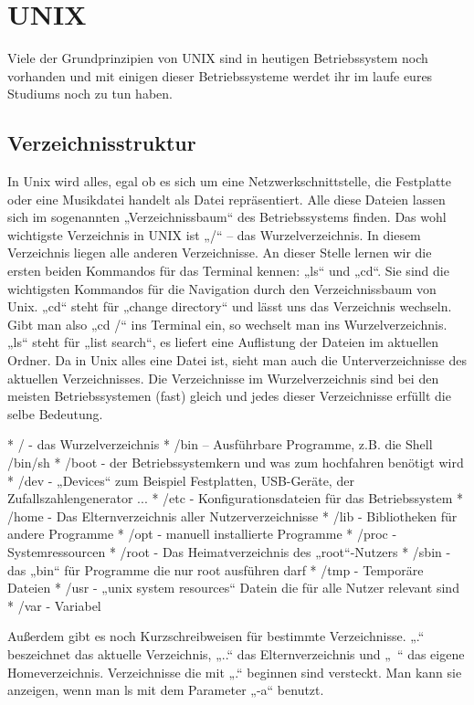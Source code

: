 \chapter{UNIX}

Viele der Grundprinzipien von UNIX sind in heutigen Betriebssystem noch vorhanden und mit einigen dieser Betriebssysteme werdet ihr im laufe eures Studiums noch zu tun haben.

\section{Verzeichnisstruktur}
In Unix wird alles, egal ob es sich um eine Netzwerkschnittstelle, die Festplatte oder eine Musikdatei handelt als Datei repräsentiert. Alle diese Dateien lassen sich im sogenannten „Verzeichnissbaum“ des Betriebssystems finden. Das wohl wichtigste Verzeichnis in UNIX ist „/“ – das Wurzelverzeichnis. In diesem Verzeichnis liegen alle anderen Verzeichnisse.
An dieser Stelle lernen wir die ersten beiden Kommandos für das Terminal kennen: „ls“ und „cd“. Sie sind die wichtigsten Kommandos für die Navigation durch den Verzeichnissbaum von Unix. „cd“ steht für „change directory“ und lässt uns das Verzeichnis wechseln. Gibt man also „cd /“ ins Terminal ein, so wechselt man ins Wurzelverzeichnis. „ls“ steht für „list search“, es liefert eine Auflistung der Dateien im aktuellen Ordner.
Da in Unix alles eine Datei ist, sieht man auch die Unterverzeichnisse des aktuellen Verzeichnisses.
Die Verzeichnisse im Wurzelverzeichnis sind bei den meisten Betriebssystemen (fast) gleich und jedes dieser Verzeichnisse erfüllt die selbe Bedeutung.

* / - das Wurzelverzeichnis
* /bin – Ausführbare Programme, z.B. die Shell /bin/sh 
* /boot - der Betriebssystemkern und was zum hochfahren benötigt wird
* /dev - „Devices“ zum Beispiel Festplatten, USB-Geräte, der Zufallszahlengenerator ...
* /etc - Konfigurationsdateien für das Betriebssystem 
* /home - Das Elternverzeichnis aller Nutzerverzeichnisse
* /lib - Bibliotheken für andere Programme
* /opt - manuell installierte Programme
* /proc - Systemressourcen
* /root - Das Heimatverzeichnis des „root“-Nutzers
* /sbin - das „bin“ für Programme die nur root ausführen darf
* /tmp - Temporäre Dateien
* /usr - „unix system resources“ Datein die für alle Nutzer relevant sind
* /var - Variabel

Außerdem gibt es noch Kurzschreibweisen für bestimmte Verzeichnisse. „.“ beszeichnet das aktuelle Verzeichnis, „..“ das Elternverzeichnis und „~“ das eigene Homeverzeichnis.
Verzeichnisse die mit „.“ beginnen sind versteckt. Man kann sie anzeigen, wenn man ls mit dem Parameter „-a“ benutzt.

